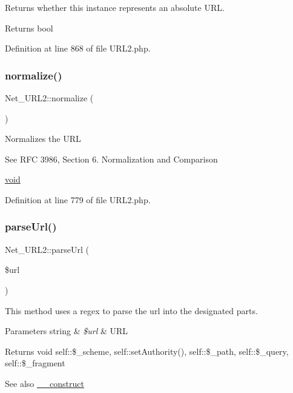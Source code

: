 Returns whether this instance represents an absolute U\+RL.

\begin{DoxyReturn}{Returns}
bool 
\end{DoxyReturn}


Definition at line 868 of file U\+R\+L2.\+php.

\hypertarget{classNet__URL2_a1bde4a2650383694a88eb2f1f061fbc4}{}\label{classNet__URL2_a1bde4a2650383694a88eb2f1f061fbc4} 
\subsubsection{\texorpdfstring{normalize()}{normalize()}}
{\footnotesize\ttfamily Net\+\_\+\+U\+R\+L2\+::normalize (\begin{DoxyParamCaption}{ }\end{DoxyParamCaption})}

Normalizes the U\+RL

See R\+FC 3986, Section 6. Normalization and Comparison

\hyperlink{}{void }

Definition at line 779 of file U\+R\+L2.\+php.

\hypertarget{classNet__URL2_a498acb2786e9f3074c6d52432de4c9d4}{}\label{classNet__URL2_a498acb2786e9f3074c6d52432de4c9d4} 
\subsubsection{\texorpdfstring{parse\+Url()}{parseUrl()}}
{\footnotesize\ttfamily Net\+\_\+\+U\+R\+L2\+::parse\+Url (\begin{DoxyParamCaption}\item[{}]{\$url }\end{DoxyParamCaption})\hspace{0.3cm}{\ttfamily [protected]}}

This method uses a regex to parse the url into the designated parts.


\begin{DoxyParams}[1]{Parameters}
string & {\em \$url} & U\+RL\\
\hline
\end{DoxyParams}
\begin{DoxyReturn}{Returns}
void  self\+::\$\+\_\+scheme, self\+::set\+Authority(), self\+::\$\+\_\+path, self\+::\$\+\_\+query, self\+::\$\+\_\+fragment 
\end{DoxyReturn}
\begin{DoxySeeAlso}{See also}
\hyperlink{classNet__URL2_a4c12ff0ddce6621148a4917b8040e567}{\+\_\+\+\_\+construct} 
\end{DoxySeeAlso}


